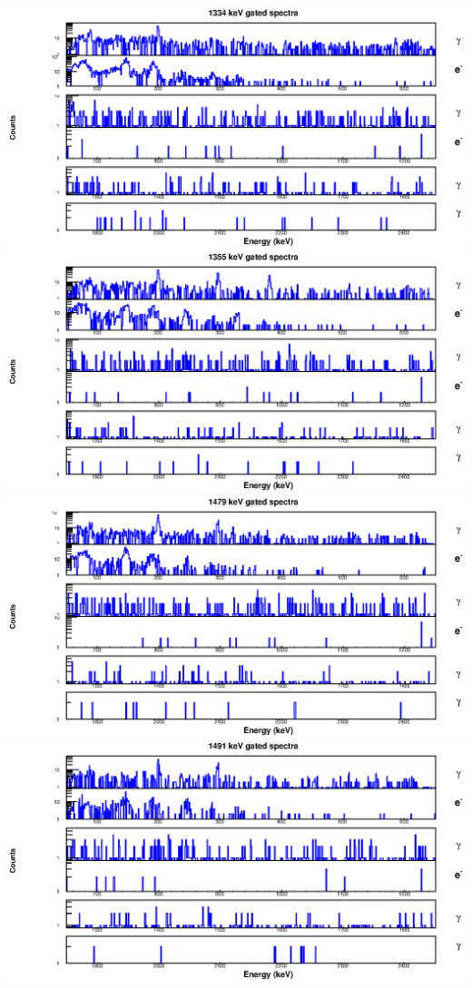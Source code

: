 \begin{landscape}
\includegraphics[scale=1.2]{156Gd_Appendix/1334_combined.eps}
\includegraphics[scale=1.2]{156Gd_Appendix/1355_combined.eps}
\includegraphics[scale=1.2]{156Gd_Appendix/1479_combined.eps}
\includegraphics[scale=1.2]{156Gd_Appendix/1491_combined.eps}

\end{landscape}
